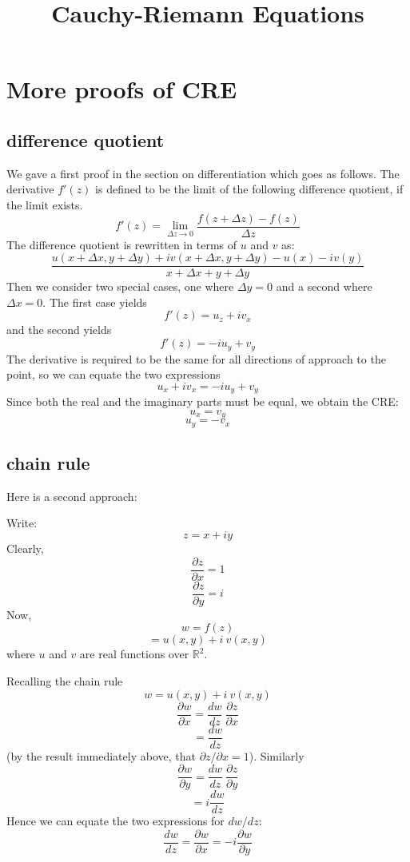 \documentclass[11pt, oneside]{article}
\title{Cauchy-Riemann Equations}
\date{}
\begin{document}
\maketitle
\Large

\section*{More proofs of CRE}
\subsection*{difference quotient}

We gave a first proof in the section on differentiation which goes as follows.  The derivative $f'(z)$ is defined to be the limit of the following difference quotient, if the limit exists.
\[ f'(z) = \lim_{\Delta z \rightarrow 0} \frac{f(z + \Delta z) - f(z)}{\Delta z} \]
The difference quotient is rewritten in terms of $u$ and $v$ as:
\[ \frac{u(x + \Delta x, y + \Delta y) + i v(x + \Delta x, y + \Delta y) - u(x) - i v(y)}{x + \Delta x + y + \Delta y} \]
Then we consider two special cases, one where $\Delta y = 0$ and a second where $\Delta x = 0$.  The first case yields
\[ f'(z) = u_z + i v_x \]
and the second yields
\[ f'(z) = -i u_y + v_y \]
The derivative is required to be the same for all directions of approach to the point, so we can equate the two expressions
\[ u_x + i v_x = -i u_y + v_y \]
Since both the real and the imaginary parts must be equal, we obtain the CRE:
\[ u_x = v_y \]
\[ u_y = - v_x \]

\subsection*{chain rule}
Here is a second approach:

Write:
\[ z = x + iy \]
Clearly,
\[ \frac{\partial z}{\partial x} = 1 \]
\[ \frac{\partial z}{\partial y} = i \]
Now,
\[ w = f(z) \]
\[ = u(x,y) + i \ v(x,y) \]
where $u$ and $v$ are real functions over $\mathbb{R}^2$.

Recalling the chain rule
\[ w = u(x,y) + i \ v(x,y) \]
\[ \frac{\partial w}{\partial x} = \frac{dw}{dz} \ \frac{\partial z}{\partial x} \]
\[ =  \frac{dw}{dz} \]
(by the result immediately above, that $\partial z/\partial x = 1$).
Similarly
\[ \frac{\partial w}{\partial y} = \frac{dw}{dz} \ \frac{\partial z}{\partial y} \]
\[ =  i \frac{dw}{dz} \]
Hence we can equate the two expressions for $dw/dz$:
\[ \frac{dw}{dz} = \frac{\partial w}{\partial x} = -i \frac{\partial w}{\partial y} \]
\end{document}
